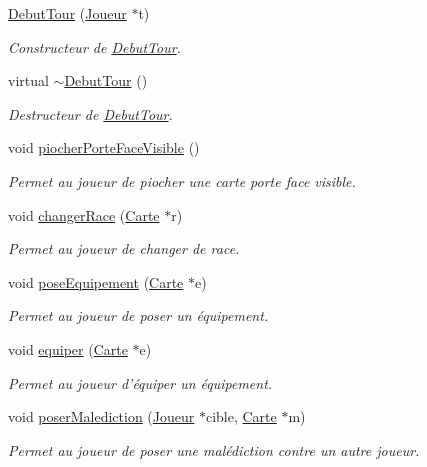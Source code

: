 \begin{DoxyCompactItemize}
\item 
\hyperlink{class_debut_tour_a3acccdb6ccd60c733d00e2817bda5b17}{Debut\-Tour} (\hyperlink{class_joueur}{Joueur} $\ast$t)
\begin{DoxyCompactList}\small\item\em Constructeur de \hyperlink{class_debut_tour}{Debut\-Tour}. \end{DoxyCompactList}\item 
\hypertarget{class_debut_tour_a95f1449c91af3e1e68d213f087e14cb2}{virtual \hyperlink{class_debut_tour_a95f1449c91af3e1e68d213f087e14cb2}{$\sim$\-Debut\-Tour} ()}\label{class_debut_tour_a95f1449c91af3e1e68d213f087e14cb2}

\begin{DoxyCompactList}\small\item\em Destructeur de \hyperlink{class_debut_tour}{Debut\-Tour}. \end{DoxyCompactList}\item 
\hypertarget{class_debut_tour_a6dc0284fd0e955798e3af4220014c2d5}{void \hyperlink{class_debut_tour_a6dc0284fd0e955798e3af4220014c2d5}{piocher\-Porte\-Face\-Visible} ()}\label{class_debut_tour_a6dc0284fd0e955798e3af4220014c2d5}

\begin{DoxyCompactList}\small\item\em Permet au joueur de piocher une carte porte face visible. \end{DoxyCompactList}\item 
void \hyperlink{class_debut_tour_ae637c2d856e4f96caeb6c3f5832a4de3}{changer\-Race} (\hyperlink{class_carte}{Carte} $\ast$r)
\begin{DoxyCompactList}\small\item\em Permet au joueur de changer de race. \end{DoxyCompactList}\item 
void \hyperlink{class_debut_tour_ab2984a9914bf4ad557918a03c7430eff}{pose\-Equipement} (\hyperlink{class_carte}{Carte} $\ast$e)
\begin{DoxyCompactList}\small\item\em Permet au joueur de poser un équipement. \end{DoxyCompactList}\item 
void \hyperlink{class_debut_tour_a6c0c2462288338c678743d02b4b42883}{equiper} (\hyperlink{class_carte}{Carte} $\ast$e)
\begin{DoxyCompactList}\small\item\em Permet au joueur d'équiper un équipement. \end{DoxyCompactList}\item 
void \hyperlink{class_debut_tour_aeb01b4744259f8da83b42ca79863080c}{poser\-Malediction} (\hyperlink{class_joueur}{Joueur} $\ast$cible, \hyperlink{class_carte}{Carte} $\ast$m)
\begin{DoxyCompactList}\small\item\em Permet au joueur de poser une malédiction contre un autre joueur. \end{DoxyCompactList}\end{DoxyCompactItemize}
